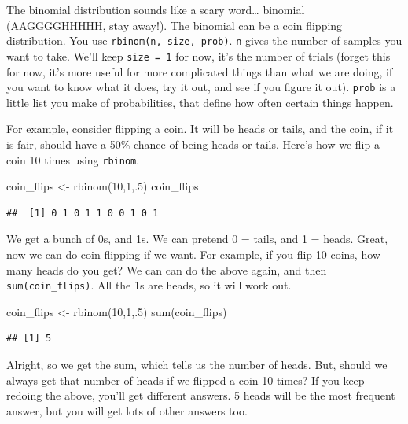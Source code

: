 \documentclass[
]{book}
\newenvironment{Shaded}{\begin{snugshade}}{\end{snugshade}}
\newcommand{\DecValTok}[1]{\textcolor[rgb]{0.00,0.00,0.81}{#1}}
\newcommand{\FunctionTok}[1]{\textcolor[rgb]{0.00,0.00,0.00}{#1}}
\newcommand{\NormalTok}[1]{#1}
\newcommand{\OtherTok}[1]{\textcolor[rgb]{0.56,0.35,0.01}{#1}}
\begin{document}
The binomial distribution sounds like a scary word\ldots{} binomial (AAGGGGHHHHH, stay away!). The binomial can be a coin flipping distribution. You use \texttt{rbinom(n,\ size,\ prob)}. \texttt{n} gives the number of samples you want to take. We'll keep \texttt{size\ =\ 1} for now, it's the number of trials (forget this for now, it's more useful for more complicated things than what we are doing, if you want to know what it does, try it out, and see if you figure it out). \texttt{prob} is a little list you make of probabilities, that define how often certain things happen.

For example, consider flipping a coin. It will be heads or tails, and the coin, if it is fair, should have a 50\% chance of being heads or tails. Here's how we flip a coin 10 times using \texttt{rbinom}.

\begin{Shaded}
\begin{Highlighting}[]
\NormalTok{coin\_flips }\OtherTok{\textless{}{-}} \FunctionTok{rbinom}\NormalTok{(}\DecValTok{10}\NormalTok{,}\DecValTok{1}\NormalTok{,.}\DecValTok{5}\NormalTok{)}
\NormalTok{coin\_flips}
\end{Highlighting}
\end{Shaded}

\begin{verbatim}
##  [1] 0 1 0 1 1 0 0 1 0 1
\end{verbatim}

We get a bunch of 0s, and 1s. We can pretend 0 = tails, and 1 = heads. Great, now we can do coin flipping if we want. For example, if you flip 10 coins, how many heads do you get? We can can do the above again, and then \texttt{sum(coin\_flips)}. All the 1s are heads, so it will work out.

\begin{Shaded}
\begin{Highlighting}[]
\NormalTok{coin\_flips }\OtherTok{\textless{}{-}} \FunctionTok{rbinom}\NormalTok{(}\DecValTok{10}\NormalTok{,}\DecValTok{1}\NormalTok{,.}\DecValTok{5}\NormalTok{)}
\FunctionTok{sum}\NormalTok{(coin\_flips)}
\end{Highlighting}
\end{Shaded}

\begin{verbatim}
## [1] 5
\end{verbatim}

Alright, so we get the sum, which tells us the number of heads. But, should we always get that number of heads if we flipped a coin 10 times? If you keep redoing the above, you'll get different answers. 5 heads will be the most frequent answer, but you will get lots of other answers too.
\end{document}

